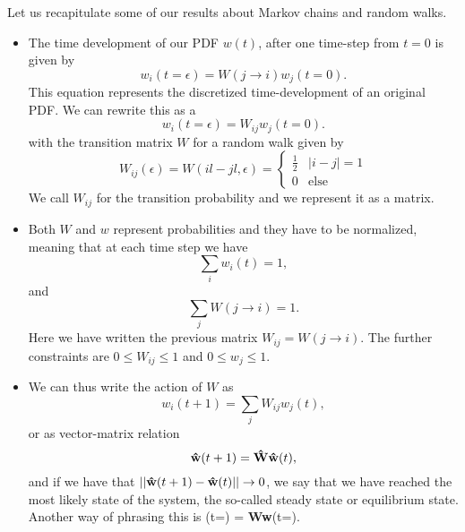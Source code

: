 Let us recapitulate some of our results about Markov chains and random walks.
\begin{itemize}
\item The time development of our PDF $w(t)$, after one time-step from $t=0$ is given by
\[
   w_i(t=\epsilon) = W(j\rightarrow i)w_j(t=0).
\]   
This equation represents the discretized time-development of an original 
PDF.  We can rewrite this as a 
\[
   w_i(t=\epsilon) = W_{ij}w_j(t=0).
\]
with the transition matrix $W$ for a random walk given by
\[
   W_{ij}(\epsilon)=W(il-jl,\epsilon)=\left\{\begin{array}{cc}\frac{1}{2} & |i-j| = 1\\
                                             0 & \mathrm{else} \end{array} \right.
\]
We call $W_{ij}$ for the transition probability and we represent it
as a matrix. 
\item Both  $W$ and $w$ represent probabilities and they have to be normalized, meaning that at each time step we have 
\[
   \sum_i w_i(t) = 1, 
\]
and 
\[ 
   \sum_j W(j\rightarrow i) = 1.
\]
Here we have written the previous matrix $W_{ij}=W(j\rightarrow i)$.
The further constraints are
$0 \le W_{ij} \le 1$  and  $0 \le w_{j} \le 1$.
\item We can thus write the action of $W$ as 
\[
   w_i(t+1) = \sum_jW_{ij}w_j(t),
\]
or as vector-matrix relation
\[
   {\bf \hat{w}}(t+1) = {\bf \hat{W}\hat{w}}(t),
\]
and if we have that $||{\bf \hat{w}}(t+1)-{\bf \hat{w}}(t)||\rightarrow 0$, we say that 
we have reached the most likely state of the system, the so-called steady state or equilibrium state.
Another way of phrasing this is
       (t=\infty) = {\bf Ww}(t=\infty). \ee   
\label{eq:finalstage}
\end{itemize}

